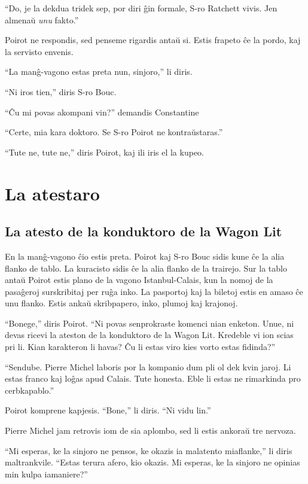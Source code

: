 ``Do, je la dekdua tridek sep, por diri ĝin formale, S-ro Ratchett vivis. Jen almenaŭ \emph{unu} fakto.''

Poirot ne respondis, sed penseme rigardis antaŭ si. Estis frapeto ĉe la pordo, kaj la servisto envenis.

``La manĝ-vagono estas preta nun, sinjoro,'' li diris.

``Ni iros tien,'' diris S-ro Bouc.

``Ĉu mi povas akompani vin?'' demandis Constantine

``Certe, mia kara doktoro. Se S-ro Poirot ne kontraŭstaras.''

``Tute ne, tute ne,'' diris Poirot, kaj ili iris el la kupeo.

\part{La atestaro}
\renewcommand*{\theHchapter}{chX.\the\value{chapter}}
\setcounter{chapter}{0}


\chapter[La atesto de la konduktoro de la Wagon Lit]{La atesto de la konduktoro de la Wagon Lit}


En la manĝ-vagono ĉio estis preta. Poirot kaj S-ro Bouc sidis kune ĉe la alia flanko de tablo. La kuracisto sidis ĉe la alia flanko de la trairejo. Sur la tablo antaŭ Poirot estis plano de la vagono Istanbul-Calais, kun la nomoj de la pasaĝeroj surskribitaj per ruĝa inko. La pasportoj kaj la biletoj estis en amaso ĉe unu flanko. Estis ankaŭ skribpapero, inko, plumoj kaj krajonoj.

``Bonege,'' diris Poirot. ``Ni povas senprokraste komenci nian enketon. Unue, ni devas ricevi la ateston de la konduktoro de la Wagon Lit. Kredeble vi ion scias pri li. Kian karakteron li havas? Ĉu li estas viro kies vorto estas fidinda?''

``Sendube. Pierre Michel laboris por la kompanio dum pli ol dek kvin jaroj. Li estas franco kaj loĝas apud Calais. Tute honesta. Eble li estas ne rimarkinda pro cerbkapablo.''

Poirot komprene kapjesis. ``Bone,'' li diris. ``Ni vidu lin.''

Pierre Michel jam retrovis iom de sia aplombo, sed li estis ankoraŭ tre nervoza.

``Mi esperas, ke la sinjoro ne pensos, ke okazis ia malatento miaflanke,'' li diris maltrankvile. ``Estas terura afero, kio okazis. Mi esperas, ke la sinjoro ne opinias min kulpa iamaniere?''


